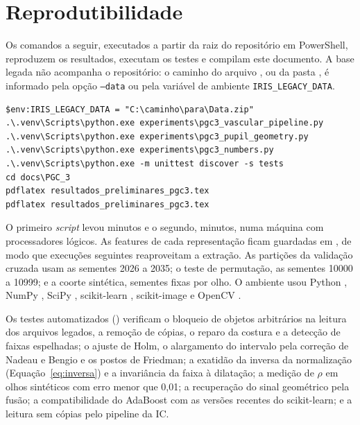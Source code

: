 \chapter{Reprodutibilidade}
\label{ap:repro}

Os comandos a seguir, executados a partir da raiz do repositório em
PowerShell, reproduzem os resultados, executam os testes e compilam este
documento. A base legada não acompanha o repositório: o caminho do arquivo
, ou da pasta , é informado pela opção
\texttt{--data} ou pela variável de ambiente \texttt{IRIS\_LEGACY\_DATA}.

\begin{SingleSpace}
\footnotesize
\begin{verbatim}
$env:IRIS_LEGACY_DATA = "C:\caminho\para\Data.zip"
.\.venv\Scripts\python.exe experiments\pgc3_vascular_pipeline.py
.\.venv\Scripts\python.exe experiments\pgc3_pupil_geometry.py
.\.venv\Scripts\python.exe experiments\pgc3_numbers.py
.\.venv\Scripts\python.exe -m unittest discover -s tests
cd docs\PGC_3
pdflatex resultados_preliminares_pgc3.tex
pdflatex resultados_preliminares_pgc3.tex
\end{verbatim}
\end{SingleSpace}

O primeiro \emph{script} levou  minutos e o segundo,
 minutos, numa máquina com  processadores lógicos.
As features de cada representação ficam guardadas em
, de modo que execuções seguintes reaproveitam a
extração. As partições da validação cruzada usam as sementes 2026 a 2035; o
teste de permutação, as sementes 10000 a 10999; e a coorte sintética,
sementes fixas por olho. O ambiente usou Python , NumPy
, SciPy , scikit-learn 
\citep*{Pedregosa2011}, scikit-image  \citep*{vanderWalt2014}
e OpenCV  \citep*{Bradski2000}.

Os testes automatizados () verificam o bloqueio de
objetos arbitrários na leitura dos arquivos legados, a remoção de cópias, o
reparo da costura e a detecção de faixas espelhadas; o ajuste de Holm, o
alargamento do intervalo pela correção de Nadeau e Bengio e os postos de
Friedman; a exatidão da inversa da normalização (Equação~\ref{eq:inversa}) e
a invariância da faixa à dilatação; a medição de $\rho$ em olhos sintéticos
com erro menor que 0,01; a recuperação do sinal geométrico pela fusão; a
compatibilidade do AdaBoost com as versões recentes do scikit-learn; e a
leitura sem cópias pelo pipeline da IC.

